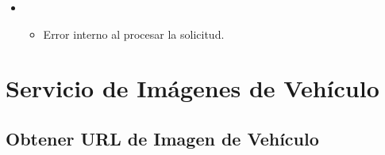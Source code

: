 \documentclass[a4paper,11pt,spanish]{sphinxmanual}
\begin{document}
\begin{fulllineitems}
\begin{itemize}
\begin{itemize}
\end{itemize}

\begin{sphinxVerbatim}[commandchars=\\\{\}]
\end{sphinxVerbatim}

\item {} 
\sphinxAtStartPar
{}
\begin{itemize}
\item {} 
\sphinxAtStartPar
Error interno al procesar la solicitud.

\end{itemize}

\end{itemize}

\end{fulllineitems}



\section{Servicio de Imágenes de Vehículo}
\label{\detokenize{endpoints:servicio-de-imagenes-de-vehiculo}}

\subsection{Obtener URL de Imagen de Vehículo}
\label{\detokenize{endpoints:obtener-url-de-imagen-de-vehiculo}}
\end{document}
